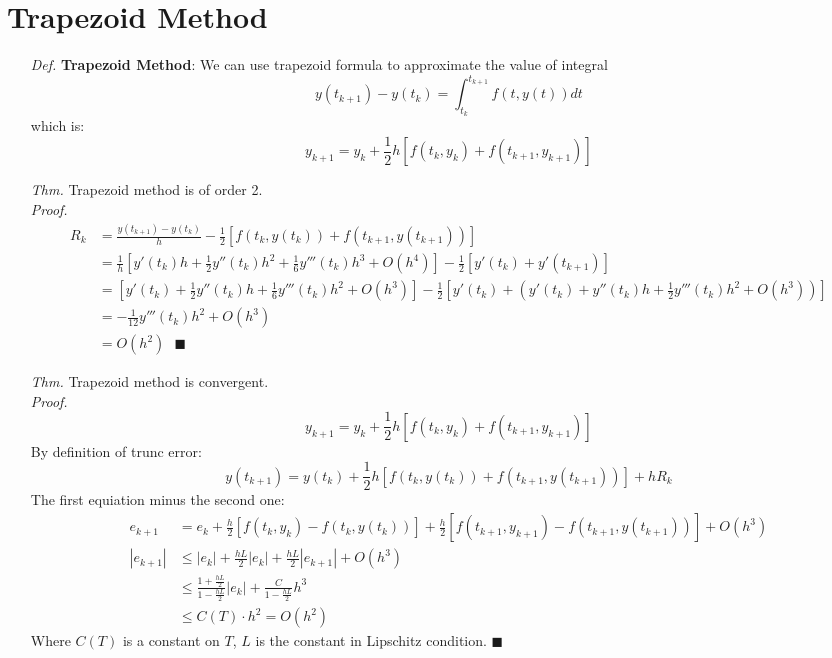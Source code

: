\documentclass[a4paper, 11pt]{article}
\begin{document}
\section{Trapezoid Method}
\begin{itemize}
	\item[\textit{Def.}] \textbf{Trapezoid Method}: We can use trapezoid formula to approximate the value of integral
	$$
	y(t_{k+1})-y(t_{k}) = \int_{t_k}^{t_{k+1}} f(t, y(t))dt
	$$
	which is:
	$$
	y_{k+1} = y_k + \frac{1}{2}h\left[f(t_k, y_k)+f(t_{k+1}, y_{k+1})\right]
	$$
	\item[\textit{Thm.}] Trapezoid method is of order 2. \\
	\textit{Proof.~~}
	\begin{equation}
		\begin{split}
			R_k &= \frac{y(t_{k+1})-y({t_k})}{h} - \frac{1}{2}[f(t_k, y(t_k))+f(t_{k+1}, y(t_{k+1}))] \\
			&= \frac{1}{h}\left[y'(t_k)h+\frac{1}{2}y''(t_k)h^2+\frac{1}{6}y'''(t_k)h^3+O(h^4)\right]- \frac{1}{2}[y'(t_k)+y'(t_{k+1})] \\
			&=\left[y'(t_k)+\frac{1}{2}y''(t_k)h+\frac{1}{6}y'''(t_k)h^2+O(h^3)\right] - \frac{1}{2}\left[y'(t_k)+\left(y'(t_k)+y''(t_k)h+\frac{1}{2}y'''(t_k)h^2+O(h^3)\right)\right]\\
			&=-\frac{1}{12}y'''(t_k)h^2 + O(h^3)\\
			&=O(h^2)~~~\blacksquare
		\end{split}
	\end{equation}

	\item[\textit{Thm.}] Trapezoid method is convergent. \\
	\textit{Proof.~~}
	$$
	y_{k+1} = y_k + \frac{1}{2}h\left[f(t_k, y_k)+f(t_{k+1}, y_{k+1})\right]
	$$
	By definition of trunc error:
	$$
	y(t_{k+1}) = y(t_k) + \frac{1}{2}h\left[f(t_k, y(t_k))+f(t_{k+1}, y(t_{k+1}))\right] + hR_k
	$$
	The first equiation minus the second one:
	\begin{equation}
		\begin{split}
			e_{k+1} &= e_k + \frac{h}{2}[f(t_k, y_k)-f(t_k, y(t_k))] + \frac{h}{2}[f(t_{k+1}, y_{k+1})-f(t_{k+1}, y(t_{k+1}))] + O(h^3) \\
			|e_{k+1}| &\leq |e_k| + \frac{hL}{2}|e_k| + \frac{hL}{2}|e_{k+1}| + O(h^3)\\
			&\leq \frac{1+\frac{hL}{2}}{1-\frac{hL}{2}}|e_k| + \frac{C}{1-\frac{hL}{2}}h^3\\
			&\leq C(T)\cdot h^2 = O(h^2)
		\end{split}
	\end{equation}
	Where $C(T)$ is a constant on $T$, $L$ is the constant in Lipschitz condition. $\blacksquare$

\end{itemize}
\end{document}
